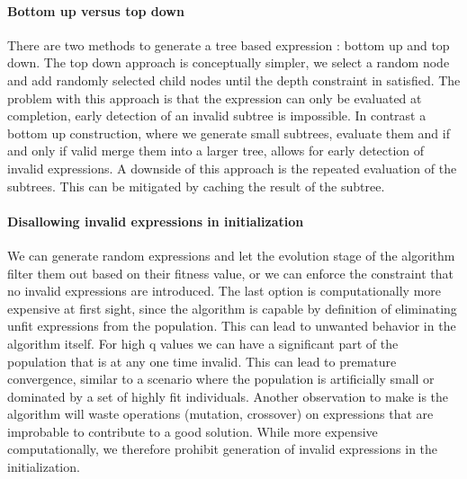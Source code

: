 \paragraph{Bottom up versus top down}
There are two methods to generate a tree based expression : bottom up and top down. The top down approach is conceptually simpler, we select a random node and add randomly selected child nodes until the depth constraint in satisfied. The problem with this approach is that the expression can only be evaluated at completion, early detection of an invalid subtree is impossible. 
In contrast a bottom up construction, where we generate small subtrees, evaluate them and if and only if valid merge them into a larger tree, allows for early detection of invalid expressions. A downside of this approach is the repeated evaluation of the subtrees. This can be mitigated by caching the result of the subtree.

\paragraph{Disallowing invalid expressions in initialization}
We can generate random expressions and let the evolution stage of the algorithm filter them out based on their fitness value, or we can enforce the constraint that no invalid expressions are introduced. The last option is computationally more expensive at first sight, since the algorithm is capable by definition of eliminating unfit expressions from the population. 
This can lead to unwanted behavior in the algorithm itself. For high q values we can have a significant part of the population that is at any one time invalid. This can lead to premature convergence, similar to a scenario where the population is artificially small or dominated by a set of highly fit individuals. Another observation to make is the algorithm will waste operations (mutation, crossover) on expressions that are improbable to contribute to a good solution. 
While more expensive computationally, we therefore prohibit generation of invalid expressions in the initialization. 

